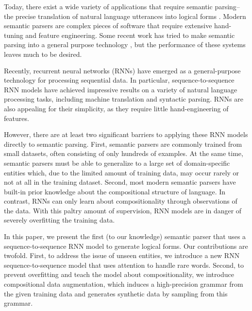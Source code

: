 \documentclass[11pt,letterpaper]{article}
\newcommand\pl[1]{\textcolor{red}{[PL: #1]}}
\begin{document}
Today, there exist a wide variety of applications that 
require semantic parsing--the precise translation of
natural language utterances into logical forms 
\cite{zelle96geoquery,zettlemoyer05ccg,zettlemoyer07relaxed,liang11dcs,artzi2013weakly,berant2013freebase,kushman2013regex}.
Modern semantic parsers are complex pieces of software
that require extensive hand-tuning and feature engineering.
Some recent work has tried to make semantic parsing
into a general purpose technology \cite{wang2015overnight},
but the performance of these systems leaves much to be desired.

Recently, recurrent neural networks (RNNs) have emerged
as a general-purpose technology for processing sequential data.
In particular, sequence-to-sequence RNN models
have achieved impressive results on a variety of natural language processing
tasks, including machine translation and syntactic parsing.
RNNs are also appealing for their simplicity, as they require 
little hand-engineering of features.

However, there are at least two significant barriers to applying these 
RNN models directly to semantic parsing.
First, semantic parsers are commonly trained from small datasets,
often consisting of only hundreds of examples.
At the same time, semantic parsers
must be able to generalize to a large set of 
domain-specific entities which, due to the limited
amount of training data, may occur rarely or not at all
in the training dataset.
Second, most modern semantic parsers have built-in
prior knowledge about the compositional structure of language.
In contrast, RNNs can only learn about compositionality
through observations of the data.
With this paltry amount of supervision,
RNN models are in danger of severely overfitting the training data.

In this paper, we present the first (to our knowledge)
semantic parser that uses a sequence-to-sequence RNN model to generate
logical forms.  
Our contributions are twofold.
First, to address the issue of unseen entities,
we introduce a new RNN sequence-to-sequence model that uses 
attention to handle rare words.
Second, to prevent overfitting and teach the model about compositionality,
we introduce compositional data augmentation,
which induces a high-precision grammar from the given training data
and generates synthetic data by sampling from this grammar.

\end{document}
